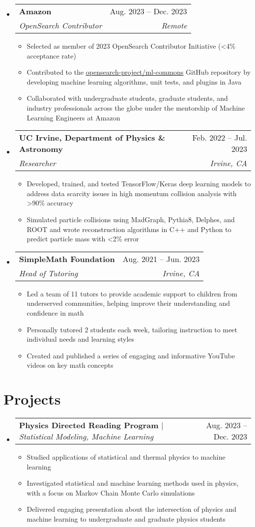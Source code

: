 \documentclass[letterpaper,11pt]{article}
\makeatletter
\newcommand{\resumeItem}[1]{
  \item\small{
    {#1 \vspace{-2pt}}
  }
}
\newcommand{\resumeSubheading}[4]{
  \vspace{-2pt}\item
    \begin{tabular*}{0.97\textwidth}[t]{l@{\extracolsep{\fill}}r}
      \textbf{#1} & #2 \\
      \textit{\small#3} & \textit{\small #4} \\
    \end{tabular*}\vspace{-7pt}
}
\newcommand{\resumeProjectHeading}[2]{
    \item
    \begin{tabular*}{0.97\textwidth}{l@{\extracolsep{\fill}}r}
      \small#1 & #2 \\
    \end{tabular*}\vspace{-7pt}
}
\newcommand{\resumeSubHeadingListStart}{\begin{itemize}[leftmargin=0.15in, label={}]}
\newcommand{\resumeSubHeadingListEnd}{\end{itemize}}
\newcommand{\resumeItemListStart}{\begin{itemize}}
\newcommand{\resumeItemListEnd}{\end{itemize}\vspace{-5pt}}
\makeatother
\begin{document}
  \resumeSubHeadingListStart
    \resumeSubheading
      {Amazon}{Aug. 2023 -- Dec. 2023}
      {OpenSearch Contributor}{Remote}
      \resumeItemListStart
        \resumeItem{Selected as member of 2023 OpenSearch Contributor Initiative (\textless 4\% acceptance rate)}
        \resumeItem{Contributed to the \href{https://github.com/opensearch-project/ml-commons/}{\underline{opensearch-project/ml-commons}} GitHub repository by developing machine learning algorithms, unit tests, and plugins in Java}
        \resumeItem{Collaborated with undergraduate students, graduate students, and industry professionals across the globe under the mentorship of Machine Learning Engineers at Amazon}
      \resumeItemListEnd
  \resumeSubHeadingListEnd

  \resumeSubHeadingListStart
    \resumeSubheading
      {UC Irvine, Department of Physics \& Astronomy}{Feb. 2022 -- Jul. 2023}
      {Researcher}{Irvine, CA}
      \resumeItemListStart
        \resumeItem{Developed, trained, and tested TensorFlow/Keras deep learning models to address data scarcity issues in high momentum collision analysis with \textgreater 90\% accuracy}
        \resumeItem{Simulated particle collisions using MadGraph, Pythia8, Delphes, and ROOT and wrote reconstruction algorithms in C++ and Python to predict particle mass with \textless 2\% error}
      \resumeItemListEnd
  \resumeSubHeadingListEnd

  \resumeSubHeadingListStart
    \resumeSubheading
      {SimpleMath Foundation}{Aug. 2021 -- Jun. 2023}
      {Head of Tutoring}{Irvine, CA}
      \resumeItemListStart
        \resumeItem{Led a team of 11 tutors to provide academic support to children from underserved communities, helping improve their understanding and confidence in math}
        \resumeItem{Personally tutored 2 students each week, tailoring instruction to meet individual needs and learning styles}
        \resumeItem{Created and published a series of engaging and informative YouTube videos on key math concepts}
      \resumeItemListEnd
  \resumeSubHeadingListEnd

\section{Projects}
  \resumeSubHeadingListStart
    \resumeProjectHeading
      {\textbf{Physics Directed Reading Program} $|$ \emph{Statistical Modeling, Machine Learning}}{Aug. 2023 -- Dec. 2023}
      \resumeItemListStart
        \resumeItem{Studied applications of statistical and thermal physics to machine learning}
        \resumeItem{Investigated statistical and machine learning methods used in physics, with a focus on Markov Chain Monte Carlo simulations}
        \resumeItem{Delivered engaging presentation about the intersection of physics and machine learning to undergraduate and graduate physics students}
      \resumeItemListEnd
  \resumeSubHeadingListEnd
\end{document}

